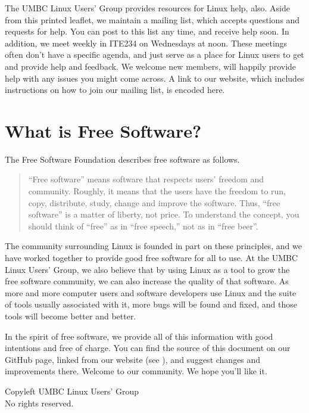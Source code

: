 \documentclass[11pt,notumble]{leaflet}
\begin{document}
The UMBC Linux Users' Group provides resources for Linux help, also. Aside from
this printed leaflet, we maintain a mailing list, which accepts questions and
requests for help. You can post to this list any time, and receive help soon. In
addition, we meet weekly in ITE234 on Wednesdays at noon. These meetings often
don't have a specific agenda, and just serve as a place for Linux users to get
and provide help and feedback. We welcome new members, will happily provide help
with any issues you might come across. A link to our website, which includes
instructions on how to join our mailing list, is encoded here.

\section{What is Free Software?}
\label{section:free-software}

The Free Software Foundation describes free software as follows.

\begin{quote}
    “Free software” means software that respects users' freedom and community.
    Roughly, it means that the users have the freedom to run, copy, distribute,
    study, change and improve the software. Thus, “free software” is a matter of
    liberty, not price. To understand the concept, you should think of “free” as
    in “free speech,” not as in “free beer”.
\end{quote}

The community surrounding Linux is founded in part on these principles, and we
have worked together to provide good free software for all to use. At the UMBC
Linux Users' Group, we also believe that by using Linux as a tool to grow the
free software community, we can also increase the quality of that software. As
more and more computer users and software developers use Linux and the suite of
tools usually associated with it, more bugs will be found and fixed, and those
tools will become better and better.

In the spirit of free software, we provide all of this information with good
intentions and free of charge. You can find the source of this document on our
GitHub page, linked from our website (see ), and
suggest changes and improvements there. Welcome to our community. We hope you'll
like it.

\vfill
\begin{center} \small 
    \textcopyleft{} Copyleft \the\year{} UMBC Linux Users' Group \\
    No rights reserved.
\end{center}
\end{document}
